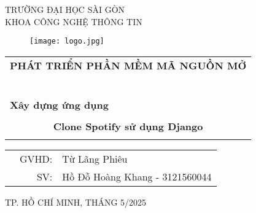 \documentclass[a4paper]{article}
\begin{document}
\begin{titlepage}
\begin{center}
TRƯỜNG ĐẠI HỌC SÀI GÒN \\
KHOA CÔNG NGHỆ THÔNG TIN
\end{center}
\vspace{1cm}

\begin{figure}[h!]
\begin{center}
\texttt{[image: logo.jpg]}
\end{center}
\end{figure}

\vspace{1cm}


\begin{center}
\begin{tabular}{c}
	\multicolumn{1}{l}{\textbf{{\Large PHÁT TRIỂN PHẦN MỀM MÃ NGUỒN MỞ}
    }}\\
	~~\\
	\hline
	\\
	\multicolumn{1}{l}{\textbf{{\Large Xây dựng ứng dụng}}}\\
	\\
	
	\textbf{{\Huge Clone Spotify sử dụng Django}}\\
	\\
	\hline
\end{tabular}
\end{center}

\vspace{3cm}

\begin{table}[h]
\begin{tabular}{rrl}
\hspace{5 cm} & GVHD: &Từ Lãng Phiêu\\
& SV: & Hồ Đỗ Hoàng Khang - 3121560044\\
\end{tabular}
\vspace{2.5 cm}
\end{table}

\begin{center}

{\footnotesize TP. HỒ CHÍ MINH, THÁNG 5/2025}
\end{center}
\end{titlepage}


\thispagestyle{empty}
\end{document}
